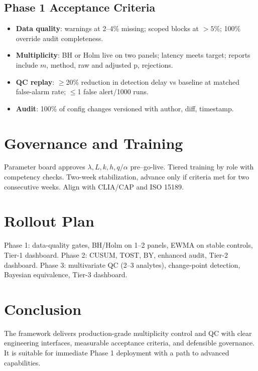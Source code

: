 \documentclass[11pt]{article}
\begin{document}
\subsection{Phase 1 Acceptance Criteria}
\begin{itemize}
  \item \textbf{Data quality}: warnings at 2--4\% missing; scoped blocks at $>5$\%; 100\% override audit completeness.
  \item \textbf{Multiplicity}: BH or Holm live on two panels; latency meets target; reports include $m$, method, raw and adjusted p, rejections.
  \item \textbf{QC replay}: $\ge$20\% reduction in detection delay vs baseline at matched false-alarm rate; $\le$1 false alert/1000 runs.
  \item \textbf{Audit}: 100\% of config changes versioned with author, diff, timestamp.
\end{itemize}

\section{Governance and Training}
Parameter board approves $\lambda, L, k, h, q/\alpha$ pre–go-live. Tiered training by role with competency checks. Two-week stabilization, advance only if criteria met for two consecutive weeks. Align with CLIA/CAP and ISO 15189.

\section{Rollout Plan}
Phase 1: data-quality gates, BH/Holm on 1--2 panels, EWMA on stable controls, Tier-1 dashboard. Phase 2: CUSUM, TOST, BY, enhanced audit, Tier-2 dashboard. Phase 3: multivariate QC (2--3 analytes), change-point detection, Bayesian equivalence, Tier-3 dashboard.

\section{Conclusion}
The framework delivers production-grade multiplicity control and QC with clear engineering interfaces, measurable acceptance criteria, and defensible governance. It is suitable for immediate Phase 1 deployment with a path to advanced capabilities.
\end{document}
